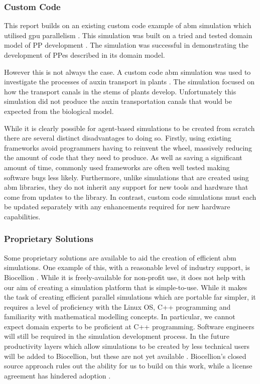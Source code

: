 \documentclass{UoYCSproject}
\begin{document}
\subsubsection{Custom Code}
This report builds on an existing custom code example of \gls{abm} simulation which utilised \gls{gpu} parallelism \cite{phil_diss}.
This simulation was built on a tried and tested domain model of \gls{PP} development \cite{kieran_thesis}.
The simulation was successful in demonstrating the development of \gls{PP}es described in its domain model.

However this is not always the case.
A custom code \gls{abm} simulation was used to investigate the processes of auxin transport in plants \cite{stepney_abm}.
The simulation focused on how the transport canals in the stems of plants develop.
Unfortunately this simulation did not produce the auxin transportation canals that would be expected from the biological model.

While it is clearly possible for agent-based simulations to be created from scratch there are several distinct disadvantages to doing so.
Firstly, using existing frameworks avoid programmers having to reinvent the wheel, massively reducing the amount of code that they need to produce.
As well as saving a significant amount of time, commonly used frameworks are often well tested making software bugs less likely.
Furthermore, unlike simulations that are created using \gls{abm} libraries, they do not inherit any support for new tools and hardware that come from updates to the library.
In contrast, custom code simulations must each be updated separately with any enhancements required for new hardware capabilities.

\subsubsection{Proprietary Solutions}
Some proprietary solutions are available to aid the creation of efficient \gls{abm} simulations.
One example of this, with a reasonable level of industry support, is Biocellion \cite{biocellion_paper}.
While it is freely-available for non-profit use, it does not help with our aim of creating a simulation platform that is simple-to-use.
While it makes the task of creating efficient parallel simulations which are portable far simpler, it requires a level of proficiency with the Linux OS, C++ programming and familiarity with mathematical modelling concepts.
In particular, we cannot expect domain experts to be proficient at C++ programming.
Software engineers will still be required in the simulation development process.
In the future productivity layers which allow simulations to be created by less technical users will be added to Biocellion, but these are not yet available \cite{biocellion_paper}.
Biocellion's closed source approach rules out the ability for us to build on this work, while a license agreement has hindered adoption \cite{physicell}.
\end{document}
